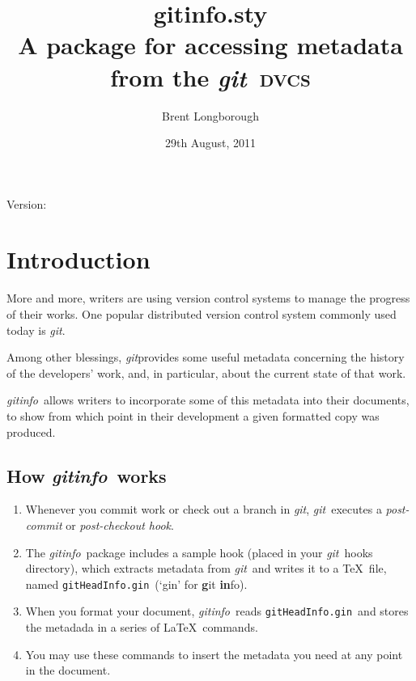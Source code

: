\documentclass[a4paper,12pt,twoside,openany]{memoir}
\newcommand{\sfit}[1]{\textit{#1}}
\newcommand{\git}{\sfit{git}}
\newcommand{\tpname}{\sfit{gitinfo}}
\newcommand{\tpfname}{\textsf{gitinfo.sty}}
\newcommand{\ginname}{gitHeadInfo.gin}
\newcommand{\metaname}{\texttt{\ginname}}
\begin{document}
\title{%
	\Huge \tpfname\\[2ex]%
	\Large A package for accessing metadata\\from the \git\ \textsc{dvcs}
	}
\author{Brent Longborough}
\date{29th August, 2011}
\maketitle

{\centering
Version:\gitVtagn\\
}
\begingroup
{}
\setlength{\afterchapskip}{20pt}
\let\clearpage\relax
\let\chaptitlefont\Large\bfseries
\vspace*{5\baselineskip}
\tableofcontents*
\clearpage
\endgroup
\chapter{Introduction}
More and more, writers are using version control systems
to manage the progress of their works.
One popular distributed version control system commonly used today
is \git.

Among other blessings, \git provides
some useful metadata concerning the history of the developers'
work, and, in particular, about the current state of that work.

\tpname\ allows writers to incorporate some of this metadata
into their documents, to show from which point in their development
a given formatted copy was produced.

\section{How \tpname\ works}
\begin{enumerate}
\item Whenever you commit work or check out a branch in \git,
\git\ executes a \textit{post-commit} or \textit{post-checkout hook}.

\item The \tpname\ package includes a sample hook
(placed in your \git\ hooks directory),
which extracts metadata from \git\ and writes it to a \TeX\ file,
named \metaname\ (`gin' for \textbf{g}it \textbf{in}fo).

\item When you format your document, \tpname\ reads 
\metaname\ and stores the metadada
in a series of \LaTeX\ commands.

\item You may use these commands to insert
the metadata you need at any point in the document.
\end{enumerate}
\end{document}
